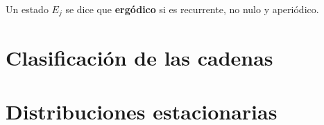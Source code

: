 \documentclass[PREyA.tex]{subfiles}
\begin{document}
\newpage
\begin{defi}
Un estado $E_j$ se dice que \textbf{ergódico} si es recurrente, no nulo y aperiódico.
\end{defi}

\section{Clasificación de las cadenas}

\section{Distribuciones estacionarias}
\end{document}
